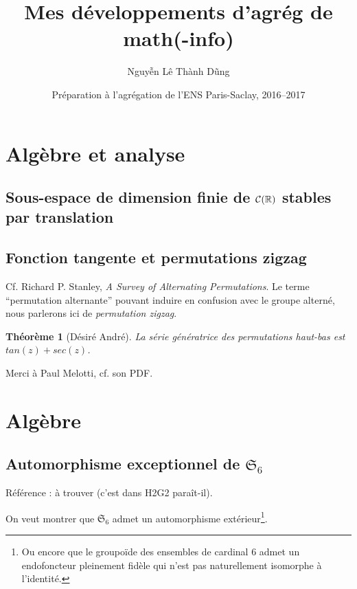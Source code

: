 \documentclass[a4paper, 11pt]{article}
\def\R{\mathbb{R}}
\def\Cf{{\cal{C}}}
\def\Sigmap{\mathfrak{S}}
\newtheorem*{theorem}{Théorème}
\begin{document}
\title{Mes développements d'agrég de math(-info)}
\author{Nguyễn Lê Thành Dũng}
\date{Préparation à l'agrégation de l'ENS Paris-Saclay, 2016--2017}
\maketitle

\tableofcontents

\section{Algèbre et analyse}

\subsection{Sous-espace de dimension finie de $\Cf(\R)$ stables par translation}


\subsection{Fonction tangente et permutations zigzag}

Cf. Richard P. Stanley, \emph{A Survey of Alternating Permutations}. Le terme
\enquote{permutation alternante} pouvant induire en confusion avec le groupe
alterné, nous parlerons ici de \emph{permutation zigzag}.

\begin{theorem}[Désiré André]
La série génératrice des permutations haut-bas est $tan(z)+sec(z)$.
\end{theorem}

Merci à Paul Melotti, cf. son PDF.


\section{Algèbre}

\subsection{Automorphisme exceptionnel de $\Sigmap_6$}

Référence : à trouver (c'est dans H2G2 paraît-il).

On veut montrer que $\Sigmap_6$ admet un automorphisme extérieur\footnote{Ou
  encore que le groupoïde des ensembles de cardinal 6 admet un endofoncteur
  pleinement fidèle qui n'est pas naturellement isomorphe à l'identité.}.
\end{document}
